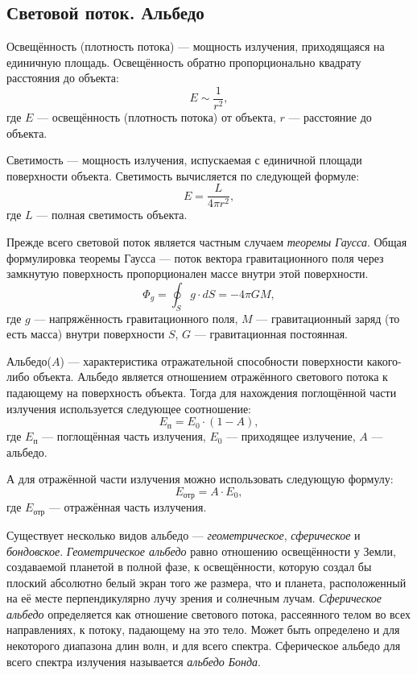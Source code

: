 \subsection{Световой поток. Альбедо}
Освещённость (плотность потока) --- мощность излучения, приходящаяся на единичную площадь. Освещённость обратно пропорционально квадрату расстояния до объекта:
\begin{equation}
E\sim \frac{1}{r^2},
\end{equation}
где $E$ --- освещённость (плотность потока) от объекта, $r$ --- расстояние до объекта.

Светимость --- мощность излучения, испускаемая с единичной площади поверхности объекта. Светимость вычисляется по следующей формуле:
\begin{equation}
E=\frac{L}{4\pi r^2},
\end{equation}
где $L$ --- полная светимость объекта.

Прежде всего световой поток является частным случаем \textit{теоремы Гаусса}. Общая формулировка теоремы Гаусса --- поток вектора гравитационного поля через замкнутую поверхность пропорционален массе внутри этой поверхности. 
\begin{equation}
\Phi_g=\oint_Sg\cdot dS=-4\pi GM,
\end{equation}
где $g$ --- напряжённость гравитационного поля, $M$ --- гравитационный заряд (то есть масса) внутри поверхности $S$, $G$ --- гравитационная постоянная.


Альбедо($A$) --- характеристика отражательной способности поверхности какого-либо объекта. Альбедо является отношением отражённого светового потока к падающему на поверхность объекта. Тогда для нахождения поглощённой части излучения используется следующее соотношение:
\begin{equation}
E_{\text{п}}=E_0\cdot (1-A),
\end{equation}
где $E_{\text{п}}$ --- поглощённая часть излучения, $E_0$ --- приходящее излучение, $A$ --- альбедо.

А для отражённой части излучения можно использовать следующую формулу:
\begin{equation}
E_{\text{отр}}=A\cdot E_0,
\end{equation}
где $E_{\text{отр}}$ --- отражённая часть излучения.

Существует несколько видов альбедо --- \textit{геометрическое}, \textit{сферическое} и \textit{бондовское}. \textit{Геометрическое альбедо} равно отношению освещённости у Земли, создаваемой планетой в полной фазе, к освещённости, которую создал бы плоский абсолютно белый экран того же размера, что и планета, расположенный на её месте перпендикулярно лучу зрения и солнечным лучам. \textit{Сферическое альбедо} определяется как отношение светового потока, рассеянного телом во всех направлениях, к потоку, падающему на это тело. Может быть определено и для некоторого диапазона длин волн, и для всего спектра. Сферическое альбедо для всего спектра излучения называется \textit{альбедо Бонда}.